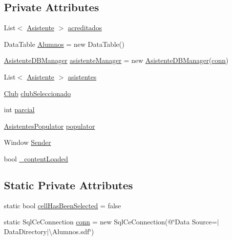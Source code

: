 \subsection*{Private Attributes}
\begin{DoxyCompactItemize}
\item 
List$<$ \hyperlink{class_asistencias__wpf_1_1_asistente}{Asistente} $>$ \hyperlink{class_asistencias__wpf_1_1_main_window_a6bee34bf669bcc522d01affb6bfe1bae}{acreditados}
\item 
Data\-Table \hyperlink{class_asistencias__wpf_1_1_main_window_ac267271cbb547ec9c8b72482ff481894}{Alumnos} = new Data\-Table()
\item 
\hyperlink{class_asistencias__wpf_1_1_asistente_d_b_manager}{Asistente\-D\-B\-Manager} \hyperlink{class_asistencias__wpf_1_1_main_window_a0b088adb7d4ae4110408a09fbdbfaa18}{asistente\-Manager} = new \hyperlink{class_asistencias__wpf_1_1_asistente_d_b_manager}{Asistente\-D\-B\-Manager}(\hyperlink{class_asistencias__wpf_1_1_main_window_a475e7650f0bbc7b9b2851de2ccdb1af1}{conn})
\item 
List$<$ \hyperlink{class_asistencias__wpf_1_1_asistente}{Asistente} $>$ \hyperlink{class_asistencias__wpf_1_1_main_window_a9460d841a29658f63dd55788a1f3e3dd}{asistentes}
\item 
\hyperlink{class_asistencias__wpf_1_1_club}{Club} \hyperlink{class_asistencias__wpf_1_1_main_window_ae8ae45fcbef622a8a77ff2a2839850d8}{club\-Seleccionado}
\item 
int \hyperlink{class_asistencias__wpf_1_1_main_window_ac8fa133c53bfc0374475a1efb34409c9}{parcial}
\item 
\hyperlink{class_asistencias__wpf_1_1_asistentes_populator}{Asistentes\-Populator} \hyperlink{class_asistencias__wpf_1_1_main_window_a89b2a643d361e6926255fc1a1906b022}{populator}
\item 
Window \hyperlink{class_asistencias__wpf_1_1_main_window_a4e35f0ebc45164d603bcc80544bc2bc1}{Sender}
\item 
bool \hyperlink{class_asistencias__wpf_1_1_main_window_ae44c6b71b9c471b3dc9ab07e778e5781}{\-\_\-content\-Loaded}
\end{DoxyCompactItemize}
\subsection*{Static Private Attributes}
\begin{DoxyCompactItemize}
\item 
static bool \hyperlink{class_asistencias__wpf_1_1_main_window_ade98915e9943a63d9b723da6e1f50ec7}{cell\-Has\-Been\-Selected} = false
\item 
static Sql\-Ce\-Connection \hyperlink{class_asistencias__wpf_1_1_main_window_a475e7650f0bbc7b9b2851de2ccdb1af1}{conn} = new Sql\-Ce\-Connection(@\char`\"{}Data Source=$|$Data\-Directory$|$\textbackslash{}Alumnos.\-sdf\char`\"{})
\end{DoxyCompactItemize}


